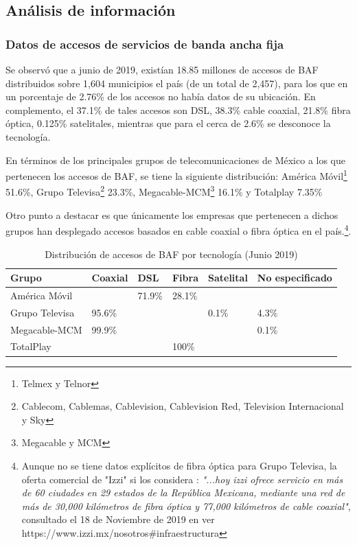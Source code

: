 \documentclass[9pt,twocolumn,twoside]{ilcss}
\begin{document}
\subsection{Análisis de información}

\subsubsection{Datos de accesos de servicios de banda ancha fija}
Se observó que a junio de 2019, existían 18.85 millones de accesos de BAF distribuidos sobre 1,604 municipios el país (de un total de 2,457), para los que en un porcentaje de 2.76\% de los accesos no había datos de su ubicación. En complemento, el 37.1\% de tales accesos son DSL, 38.3\% cable coaxial, 21.8\% fibra óptica, 0.125\% satelitales, mientras que para el cerca de 2.6\% se desconoce la tecnología.

En términos de los principales grupos de telecomunicaciones de México a los que pertenecen los accesos de BAF, se tiene la siguiente distribución: América Móvil\footnote{Telmex y Telnor}  51.6\%, Grupo Televisa\footnote{Cablecom, Cablemas, Cablevision, Cablevision Red, Television Internacional y Sky} 23.3\%, Megacable-MCM\footnote{Megacable y MCM}  16.1\% y Totalplay 7.35\%  

Otro punto a destacar es que únicamente los empresas que pertenecen a dichos grupos han desplegado accesos basados en cable coaxial o fibra óptica en el país.\footnote{Aunque no se tiene datos explícitos de fibra óptica para Grupo Televisa, la oferta comercial de "Izzi" si los considera
	: \emph{"...hoy izzi ofrece servicio en más de 60 ciudades en 29 estados de la República Mexicana, mediante una red de más de 30,000 kilómetros de fibra óptica y 77,000 kilómetros de cable coaxial"}, consultado el 18 de Noviembre de 2019 en 
	ver https://www.izzi.mx/nosotros\#infraestructura}.

\begin{table}[tbhp]
 \centering
	\caption{Distribución de accesos de BAF por tecnología (Junio 2019)\label{table:distribaccesosgrupos}}
	\begin{tabular}{@{}llllll@{}}
		\toprule
		Grupo & Coaxial & DSL & Fibra & Satelital & No especificado \\ \midrule
		América Móvil &  & 71.9\% & 28.1\% &  &  \\ 
		Grupo Televisa & 95.6\% &  &  & 0.1\% & 4.3\% \\ 
		Megacable-MCM & 99.9\% &  &  &  & 0.1\% \\ 
		TotalPlay &  &  & 100\% &  &  \\ \bottomrule
	\end{tabular}
\end{table}
\end{document}
